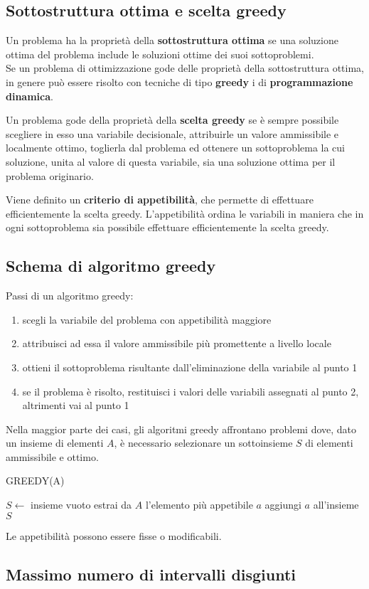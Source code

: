 \documentclass[11pt]{article}
\theoremstyle{proprietà}
\begin{document}
\subsection{Sottostruttura ottima e scelta greedy}
Un problema ha la proprietà della \textbf{sottostruttura ottima} se una soluzione ottima del problema include le soluzioni 
ottime dei suoi sottoproblemi.\\
Se un problema di ottimizzazione gode delle proprietà della sottostruttura ottima, in genere può essere risolto con tecniche 
di tipo \textbf{greedy} i di \textbf{programmazione dinamica}.

Un problema gode della proprietà della \textbf{scelta greedy} se è sempre possibile scegliere in esso una variabile decisionale, 
attribuirle un valore ammissibile e localmente ottimo, toglierla dal problema ed ottenere un sottoproblema la cui soluzione, 
unita al valore di questa variabile, sia una soluzione ottima per il problema originario.

Viene definito un \textbf{criterio di appetibilità}, che permette di effettuare efficientemente la scelta greedy. L'appetibilità 
ordina le variabili in maniera che in ogni sottoproblema sia possibile effettuare efficientemente la scelta greedy.
\subsection{Schema di algoritmo greedy}
Passi di un algoritmo greedy:
\begin{enumerate}
    \item scegli la variabile del problema con appetibilità maggiore 
    \item attribuisci ad essa il valore ammissibile più promettente a livello locale 
    \item ottieni il sottoproblema risultante dall'eliminazione della variabile al punto 1
    \item se il problema è risolto, restituisci i valori delle variabili assegnati al punto 2, altrimenti vai al punto 1 
\end{enumerate}
Nella maggior parte dei casi, gli algoritmi greedy affrontano problemi dove, dato un insieme di elementi $A$, è necessario 
selezionare un sottoinsieme $S$ di elementi ammissibile e ottimo.
\begin{algorithm}
        \caption{GREEDY(A)}
    \begin{algorithmic}
        \State $S \gets$ insieme vuoto
            \State estrai da $A$ l'elemento più appetibile $a$
                \State aggiungi $a$ all'insieme $S$
            \EndIf 
        \EndWhile
    \end{algorithmic}
\end{algorithm}
Le appetibilità possono essere fisse o modificabili.
\subsection{Massimo numero di intervalli disgiunti}
\end{document}
